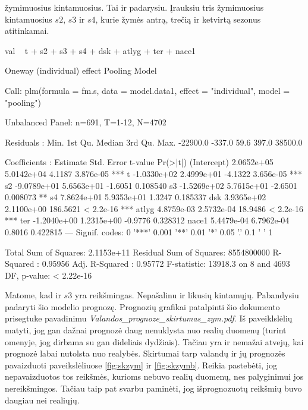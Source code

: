 \documentclass[a4paper]{article}
\begin{document}
žymimuosius kintamuosius. Tai ir padarysiu. Įrauksiu tris žymimuosius
kintamuosius $s2$, $s3$ ir $s4$, kurie žymės antrą, trečią ir ketvirtą
sezonus atitinkamai.
\begin{Schunk}
\begin{Soutput}
val ~ t + s2 + s3 + s4 + dsk + atlyg + ter + nace1
\end{Soutput}
\end{Schunk}
\begin{Schunk}
\begin{Soutput}
Oneway (individual) effect Pooling Model

Call:
plm(formula = fm.s, data = model.data1, effect = "individual", 
    model = "pooling")

Unbalanced Panel: n=691, T=1-12, N=4702

Residuals :
    Min.  1st Qu.   Median  3rd Qu.     Max. 
-22900.0   -337.0     59.6    397.0  38500.0 

Coefficients :
               Estimate  Std. Error  t-value  Pr(>|t|)    
(Intercept)  2.0652e+05  5.0142e+04   4.1187 3.876e-05 ***
t           -1.0330e+02  2.4999e+01  -4.1322 3.656e-05 ***
s2          -9.0789e+01  5.6563e+01  -1.6051  0.108540    
s3          -1.5269e+02  5.7615e+01  -2.6501  0.008073 ** 
s4           7.8624e+01  5.9353e+01   1.3247  0.185337    
dsk          3.9365e+02  2.1100e+00 186.5621 < 2.2e-16 ***
atlyg        4.8759e-03  2.5732e-04  18.9486 < 2.2e-16 ***
ter         -1.2040e+00  1.2315e+00  -0.9776  0.328312    
nace1        5.4479e-04  6.7962e-04   0.8016  0.422815    
---
Signif. codes:  0 '***' 0.001 '**' 0.01 '*' 0.05 '.' 0.1 ' ' 1 

Total Sum of Squares:    2.1153e+11
Residual Sum of Squares: 8554800000
R-Squared      :  0.95956 
      Adj. R-Squared :  0.95772 
F-statistic: 13918.3 on 8 and 4693 DF, p-value: < 2.22e-16
\end{Soutput}
\end{Schunk}
Matome, kad ir $s3$ yra reikšmingas. Nepašalinu ir likusių
kintamųjų. Pabandysiu padaryti šio modelio prognozę. Prognozių
grafikai patalpinti šio dokumento prisegtuke pavadinimu
\emph{Valandos\_prognoze\_skirtumas\_zym.pdf}. Iš paveiklslėlių
matyti, jog gan dažnai prognozė daug nenuklysta nuo realių duomenų
(turint omenyje, jog dirbama su gan dideliais dydžiais). Tačiau yra ir
nemažai atvejų, kai prognozė labai nutolsta nuo realybės. Skirtumai
tarp valandų ir jų prognozės pavaizduoti paveikslėliuose
\ref{fig:skzym} ir \ref{fig:skzymb}. Reikia pastebėti, jog
nepavaizduotos tos reikšmės, kurioms nebuvo realių duomenų, nes
palyginimui jos nereikšmingos. Tačiau taip pat svarbu paminėti, jog
išprognozuotų reikšmių buvo daugiau nei realiųjų.
\end{document}
